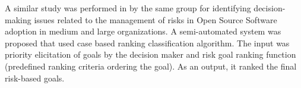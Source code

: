 A similar study was performed in \cite{7320432} by the same group
\cite{PAvesani} for identifying decision-making issues related to the
management of risks in Open Source Software adoption in medium and large
organizations. A semi-automated system was proposed that used case based
ranking classification algorithm. The input was priority elicitation of goals by
the decision maker and risk goal ranking function (predefined ranking criteria
ordering the goal). As an output, it ranked the final risk-based
goals.



